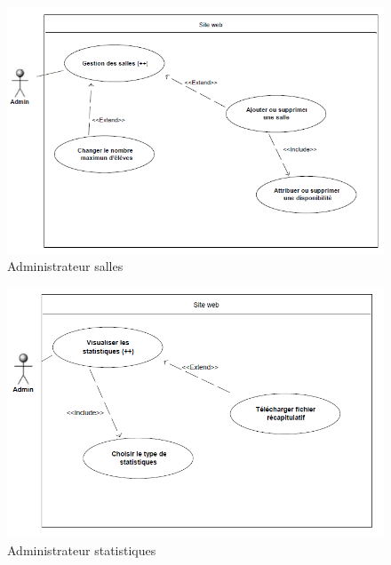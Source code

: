     \begin{figure}[h]
        \begin{center}
            \includegraphics[scale=0.70]{images/uml/adminSalles.png} 
        \end{center}

        \caption{Administrateur salles}
        \label{Administrateur salles}
    \end{figure}

    \begin{figure}[h]
        \begin{center}
            \includegraphics[scale=0.70]{images/uml/adminStats.png} 
        \end{center}

        \caption{Administrateur statistiques}
        \label{Administrateur statistiques}
    \end{figure}

